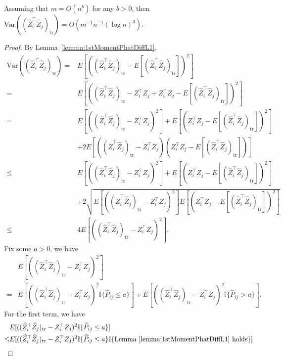 \begin{theorem}
\label{thm:VarASEL1proof}
Assuming that $m = O(n^b)$ for any $b > 0$, then $\mathrm{Var}((\hat{Z}_i^{\top} \hat{Z}_j)_{\mathrm{tr}}) = O(m^{-1} n^{-1} (\log n)^3)$.
\end{theorem}
\begin{proof}
By Lemma~\ref{lemma:1stMomentPhatDiffL1},
\begin{align*}
	\mathrm{Var}((\hat{Z}_i^{\top} \hat{Z}_j)_{\mathrm{tr}})
    = & E[((\hat{Z}_i^{\top} \hat{Z}_j)_{\mathrm{tr}} - E[(\hat{Z}_i^{\top} \hat{Z}_j)_{\mathrm{tr}}])^2] \\
    = & E[((\hat{Z}_i^{\top} \hat{Z}_j)_{\mathrm{tr}} - Z_i^{\top} Z_j + Z_i^{\top} Z_j - E[(\hat{Z}_i^{\top} \hat{Z}_j)_{\mathrm{tr}}])^2] \\
    = & E[((\hat{Z}_i^{\top} \hat{Z}_j)_{\mathrm{tr}} - Z_i^{\top} Z_j)^2] + E[(Z_i^{\top} Z_j - E[(\hat{Z}_i^{\top} \hat{Z}_j)_{\mathrm{tr}}])^2] \\ 
    & + 2E[((\hat{Z}_i^{\top} \hat{Z}_j)_{\mathrm{tr}} - Z_i^{\top} Z_j)(Z_i^{\top} Z_j - E[(\hat{Z}_i^{\top} \hat{Z}_j)_{\mathrm{tr}}])] \\
    \le & E[((\hat{Z}_i^{\top} \hat{Z}_j)_{\mathrm{tr}} - Z_i^{\top} Z_j)^2] + E[(Z_i^{\top} Z_j - E[(\hat{Z}_i^{\top} \hat{Z}_j)_{\mathrm{tr}}])^2] \\ 
    & + 2\sqrt{E[((\hat{Z}_i^{\top} \hat{Z}_j)_{\mathrm{tr}} - Z_i^{\top} Z_j)^2] E[(Z_i^{\top} Z_j - E[(\hat{Z}_i^{\top} \hat{Z}_j)_{\mathrm{tr}}])^2]} \\
    \le & 4 E[((\hat{Z}_i^{\top} \hat{Z}_j)_{\mathrm{tr}} - Z_i^{\top} Z_j)^2].
\end{align*}
Fix some $a > 0$, we have
\begin{align*}
	& E[((\hat{Z}_i^{\top} \hat{Z}_j)_{\mathrm{tr}} - Z_i^{\top} Z_j)^2] \\
	= & E[((\hat{Z}_i^{\top} \hat{Z}_j)_{\mathrm{tr}} - Z_i^{\top} Z_j)^2 \mathbb{I}\{\hat{P}_{ij} \le a\}]
	+ E[((\hat{Z}_i^{\top} \hat{Z}_j)_{\mathrm{tr}} - Z_i^{\top} Z_j)^2 \mathbb{I}\{\hat{P}_{ij} > a\}].
\end{align*}
For the first term, we have
\begin{align*}
	& E[((\hat{Z}_i^{\top} \hat{Z}_j)_{\mathrm{tr}} - Z_i^{\top} Z_j)^2 \mathbb{I}\{\hat{P}_{ij} \le a\}] \\
	\le & E[((\hat{Z}_i^{\top} \hat{Z}_j)_{\mathrm{tr}} - Z_i^{\top} Z_j)^2 \mathbb{I}\{\hat{P}_{ij} \le a\} \mathbb{I}\{\mathrm{Lemma\ } \ref{lemma:1stMomentPhatDiffL1} \mathrm{\ holds}\}] \\

\end{align*}
\end{proof}
